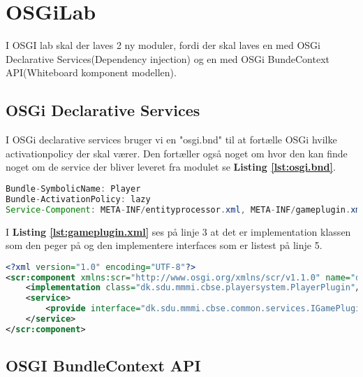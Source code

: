 \section{OSGiLab}
I OSGI lab skal der laves 2 ny moduler, fordi der skal laves en med OSGi
Declarative Services(Dependency injection) og en med OSGi BundeContext
API(Whiteboard komponent modellen).


\subsection{OSGi Declarative Services}
I OSGi declarative services bruger vi en "osgi.bnd" til at fortælle OSGi hvilke
activationpolicy der skal værer. Den fortæller også noget om hvor den kan finde
noget om de service der bliver leveret fra modulet se \textbf{Listing
\ref{lst:osgi.bnd}}.

\hfill \linebreak \hline 
{}
\hline \hfill \linebreak

\begin{lstlisting}[caption={osgi.bnd}, label={lst:osgi.bnd}, language=java]
Bundle-SymbolicName: Player
Bundle-ActivationPolicy: lazy
Service-Component: META-INF/entityprocessor.xml, META-INF/gameplugin.xml
\end{lstlisting}

I \textbf{Listing \ref{lst:gameplugin.xml}} ses på linje 3 at det er
implementation klassen som den peger på og den implementere interfaces som er
listest på linje 5.

\begin{lstlisting}[caption={gameplugin.xml}, label={lst:gameplugin.xml}, language=xml]
<?xml version="1.0" encoding="UTF-8"?>
<scr:component xmlns:scr="http://www.osgi.org/xmlns/scr/v1.1.0" name="dk.sdu.mmmi.cbse.playersystem.plugin">
    <implementation class="dk.sdu.mmmi.cbse.playersystem.PlayerPlugin"/>
    <service>
        <provide interface="dk.sdu.mmmi.cbse.common.services.IGamePluginService"/>
    </service>
</scr:component>
\end{lstlisting}



\newpage
\subsection{OSGI BundleContext API}

